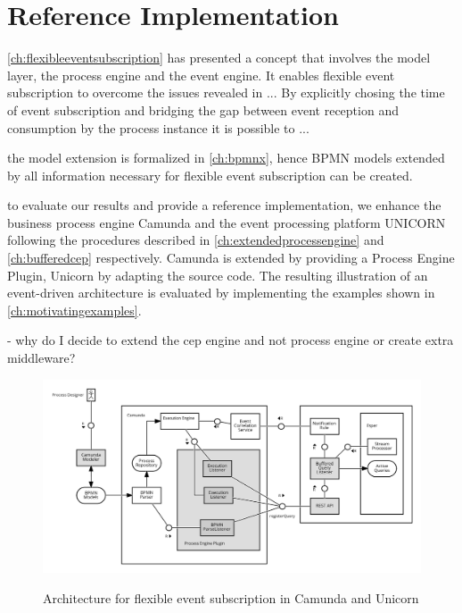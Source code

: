 \chapter{Reference Implementation}\label{ch:implementation}

\autoref{ch:flexibleeventsubscription} has presented a concept that involves the model layer, the process engine and the event engine.
It enables flexible event subscription to overcome the issues revealed in ...
By explicitly chosing the time of event subscription and bridging the gap between event reception and consumption by the process instance it is possible to ...

the model extension is formalized in \autoref{ch:bpmnx}, hence BPMN models extended by all information necessary for flexible event subscription can be created.

to evaluate our results and provide a reference implementation, we enhance the business process engine Camunda and the event processing platform UNICORN following the procedures described in \autoref{ch:extendedprocessengine} and \autoref{ch:bufferedcep} respectively.
Camunda is extended by providing a Process Engine Plugin, Unicorn by adapting the source code.
The resulting illustration of an event-driven architecture is evaluated by implementing the examples shown in \autoref{ch:motivatingexamples}.

- why do I decide to extend the cep engine and not process engine or create extra middleware?

\begin{figure}[]
	\myfloatalign
	{\includegraphics[width=1\linewidth]{chapters/implementation/flexible-evt-subscr-camunda-unicorn.png}}
	\caption{Architecture for flexible event subscription in Camunda and Unicorn}
	\label{fig:architecture-camunda-unicorn}
\end{figure}

